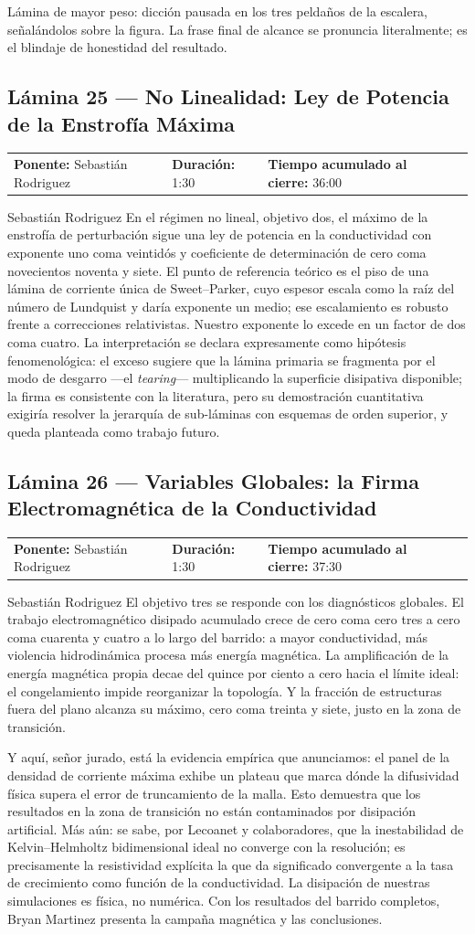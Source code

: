 \documentclass[11pt,letterpaper]{article}
\makeatletter
\newcommand{\lamina}[5]{%
  \subsection*{Lámina #1 --- #2}
  \noindent
  \begin{tabular}{@{}llll@{}}
    \textbf{Ponente:} #3 &\quad \textbf{Duración:} #4 &\quad
    \textbf{Tiempo acumulado al cierre:} #5 &
  \end{tabular}
  \vspace{2pt}}
\makeatother
\begin{document}
\begin{indicaciones}
Lámina de mayor peso: dicción pausada en los tres peldaños de la escalera,
señalándolos sobre la figura. La frase final de alcance se pronuncia
literalmente; es el blindaje de honestidad del resultado.
\end{indicaciones}

\lamina{25}{No Linealidad: Ley de Potencia de la Enstrofía Máxima}{Sebastián Rodriguez}{1:30}{36:00}

\begin{parlamento}{Sebastián Rodriguez}
En el régimen no lineal, objetivo dos, el máximo de la enstrofía de
perturbación sigue una ley de potencia en la conductividad con exponente
uno coma veintidós y coeficiente de determinación de cero coma novecientos
noventa y siete. El punto de referencia teórico es el piso de una lámina de
corriente única de Sweet--Parker, cuyo espesor escala como la raíz del
número de Lundquist y daría exponente un medio; ese escalamiento es robusto
frente a correcciones relativistas. Nuestro exponente lo excede en un
factor de dos coma cuatro. La interpretación se declara expresamente como
hipótesis fenomenológica: el exceso sugiere que la lámina primaria se
fragmenta por el modo de desgarro ---el \emph{tearing}--- multiplicando la
superficie disipativa disponible; la firma es consistente con la
literatura, pero su demostración cuantitativa exigiría resolver la
jerarquía de sub-láminas con esquemas de orden superior, y queda planteada
como trabajo futuro.
\end{parlamento}

\lamina{26}{Variables Globales: la Firma Electromagnética de la Conductividad}{Sebastián Rodriguez}{1:30}{37:30}

\begin{parlamento}{Sebastián Rodriguez}
El objetivo tres se responde con los diagnósticos globales. El trabajo
electromagnético disipado acumulado crece de cero coma cero tres a cero
coma cuarenta y cuatro a lo largo del barrido: a mayor conductividad, más
violencia hidrodinámica procesa más energía magnética. La amplificación de
la energía magnética propia decae del quince por ciento a cero hacia el
límite ideal: el congelamiento impide reorganizar la topología. Y la
fracción de estructuras fuera del plano alcanza su máximo, cero coma
treinta y siete, justo en la zona de transición.

Y aquí, señor jurado, está la evidencia empírica que anunciamos: el panel
de la densidad de corriente máxima exhibe un plateau que marca dónde la
difusividad física supera el error de truncamiento de la malla. Esto
demuestra que los resultados en la zona de transición no están contaminados
por disipación artificial. Más aún: se sabe, por Lecoanet y colaboradores,
que la inestabilidad de Kelvin--Helmholtz bidimensional ideal no converge
con la resolución; es precisamente la resistividad explícita la que da
significado convergente a la tasa de crecimiento como función de la
conductividad. La disipación de nuestras simulaciones es física, no
numérica. Con los resultados del barrido completos, Bryan Martinez
presenta la campaña magnética y las conclusiones.
\end{parlamento}
\end{document}
